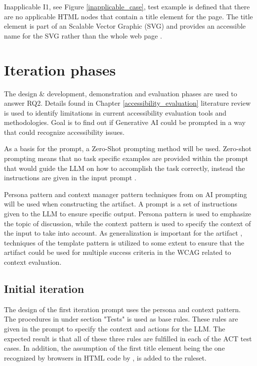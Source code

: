 Inapplicable I1, see Figure \ref{inapplicable_case}, test example is defined that there are no applicable HTML nodes that contain a title element for the page. The title element is part of an Scalable Vector Graphic (SVG) and provides an accessible name for the SVG rather than the whole web page \citep{svg_title}.


\section{Iteration phases}

The design \& development, demonstration and evaluation phases are used to answer RQ2. Details found in Chapter \ref{accessibility_evaluation} literature review is used to identify limitations in current accessibility evaluation tools and methodologies. Goal is to find out if Generative AI could be prompted in a way that could recognize accessibility issues. 

As a basis for the prompt, a Zero-Shot prompting method will be used. Zero-shot prompting means that no task specific examples are provided within the prompt that would guide the LLM on how to accomplish the task correctly, instead the instructions are given in the input prompt \citep{kojima2023large}.

Persona pattern and context manager pattern techniques from \textcite{white2023prompt} on AI prompting will be used when constructing the artifact. A prompt is a set of instructions given to the LLM to ensure specific output. Persona pattern is used to emphasize the topic of discussion, while the context pattern is used to specify the context of the input to take into account. As generalization is important for the artifact \citep{design_science_eval}, techniques of the template pattern is utilized to some extent to ensure that the artifact could be used for multiple success criteria in the WCAG related to context evaluation.

\subsection{Initial iteration}

The design of the first iteration prompt uses the persona and context pattern. The procedures in \textcite{g88} under section "Tests" is used as base rules. These rules are given in the prompt to specify the context and actions for the LLM. The expected result is that all of these three rules are fulfilled in each of the ACT test cases. In addition, the assumption of the first title element being the one recognized by browsers in HTML code by \textcite{act_rule_g88}, is added to the ruleset.

